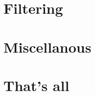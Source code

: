 \documentclass[t,handout]{beamer}
\begin{document}
\section{Filtering}


\section{Miscellanous}


\section{That's all}

\end{document}
